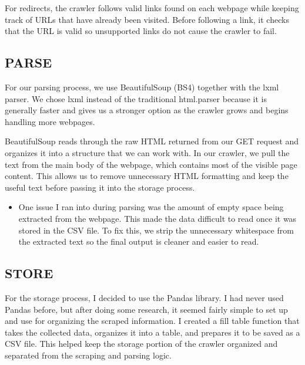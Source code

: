 \documentclass{article}
\begin{document}
\vspace{0.5em}

For redirects, the crawler follows valid links found on each webpage while keeping track of URLs that have already been visited. Before following a link, it checks that the URL is valid so unsupported links do not cause the crawler to fail.



\subsection{PARSE}

For our parsing process, we use BeautifulSoup (BS4) together with the lxml parser. We chose lxml instead of the traditional html.parser because it is generally faster and gives us a stronger option as the crawler grows and begins handling more webpages.

\vspace{0.5em}

BeautifulSoup reads through the raw HTML returned from our GET request and organizes it into a structure that we can work with. In our crawler, we pull the text from the main body of the webpage, which contains most of the visible page content. This allows us to remove unnecessary HTML formatting and keep the useful text before passing it into the storage process.

\begin{itemize}
    \item One issue I ran into during parsing was the amount of empty space being extracted from the webpage. This made the data difficult to read once it was stored in the CSV file. To fix this, we strip the unnecessary whitespace from the extracted text so the final output is cleaner and easier to read.
\end{itemize}

\vspace{0.5em}

\subsection{STORE}
For the storage process, I decided to use the Pandas library. I had never used Pandas before, but after doing some research, it seemed fairly simple to set up and use for organizing the scraped information. I created a fill table function that takes the collected data, organizes it into a table, and prepares it to be saved as a CSV file. This helped keep the storage portion of the crawler organized and separated from the scraping and parsing logic.
\end{document}
